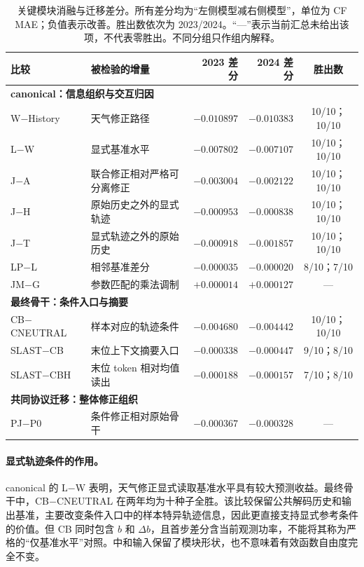\begin{table}[tbp]
 \centering
 \caption{关键模块消融与迁移差分。所有差分均为“左侧模型减右侧模型”，单位为 CF MAE；负值表示改善。胜出数依次为 2023/2024。“—”表示当前汇总未给出该项，不代表零胜出。不同分组只作组内解释。}
 \label{tab:ablation}
 \small
 \setlength{\tabcolsep}{4pt}
 \begin{tabularx}{\linewidth}{lXrrc}
 \toprule
 比较 & 被检验的增量 & 2023 差分 & 2024 差分 & 胜出数 \\
 \midrule
 \multicolumn{5}{l}{\textbf{canonical：信息组织与交互归因}} \\
 W$-$History & 天气修正路径 & $-0.010897$ & $-0.010383$ & 10/10；10/10 \\
 L$-$W & 显式基准水平 & $-0.007802$ & $-0.007107$ & 10/10；10/10 \\
 J$-$A & 联合修正相对严格可分离修正 & $-0.003004$ & $-0.002122$ & 10/10；10/10 \\
 J$-$H & 原始历史之外的显式轨迹 & $-0.000953$ & $-0.000838$ & 10/10；10/10 \\
 J$-$T & 显式轨迹之外的原始历史 & $-0.000918$ & $-0.001857$ & 10/10；10/10 \\
 LP$-$L & 相邻基准差分 & $-0.000035$ & $-0.000020$ & 8/10；7/10 \\
 JM$-$G & 参数匹配的乘法调制 & $+0.000014$ & $+0.000127$ & — \\
 \midrule
 \multicolumn{5}{l}{\textbf{最终骨干：条件入口与摘要}} \\
 CB$-$CNEUTRAL & 样本对应的轨迹条件 & $-0.004680$ & $-0.004442$ & 10/10；10/10 \\
 SLAST$-$CB & 末位上下文摘要入口 & $-0.000338$ & $-0.000447$ & 9/10；8/10 \\
 SLAST$-$CBH & 末位 token 相对均值读出 & $-0.000188$ & $-0.000157$ & 7/10；8/10 \\
 \midrule
 \multicolumn{5}{l}{\textbf{共同协议迁移：整体修正组织}} \\
 PJ$-$P0 & 条件修正相对原始骨干 & $-0.000367$ & $-0.000328$ & — \\
 \bottomrule
 \end{tabularx}
\end{table}

\paragraph{显式轨迹条件的作用。}
canonical 的 L$-$W 表明，天气修正显式读取基准水平具有较大预测收益。最终骨干中，CB$-$CNEUTRAL 在两年均为十种子全胜。该比较保留公共解码历史和输出基准，主要改变条件入口中的样本特异轨迹信息，因此更直接支持显式参考条件的价值。但 CB 同时包含 $b$ 和 $\Delta b$，且首步差分含当前观测功率，不能将其称为严格的“仅基准水平”对照。中和输入保留了模块形状，也不意味着有效函数自由度完全不变。


